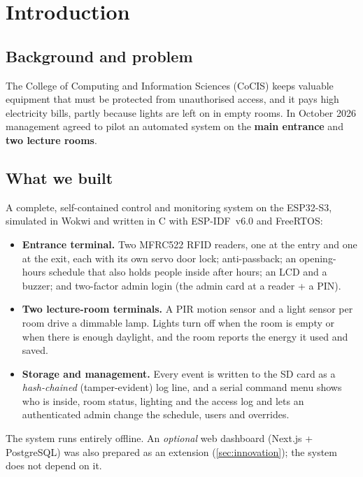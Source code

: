 \section{Introduction}
\label{sec:intro}

\subsection{Background and problem}
The College of Computing and Information Sciences (CoCIS) keeps valuable equipment that must be
protected from unauthorised access, and it pays high electricity bills, partly because lights are
left on in empty rooms. In October 2026 management agreed to pilot an automated system on the
\textbf{main entrance} and \textbf{two lecture rooms}.

\subsection{What we built}
A complete, self-contained control and monitoring system on the ESP32-S3, simulated in Wokwi and
written in C with ESP-IDF~v6.0 and FreeRTOS:
\begin{itemize}
  \item \textbf{Entrance terminal.} Two MFRC522 RFID readers, one at the entry and one at the
        exit, each with its own servo door lock; anti-passback; an opening-hours schedule that also
        holds people inside after hours; an LCD and a buzzer; and two-factor admin login (the admin
        card at a reader + a PIN).
  \item \textbf{Two lecture-room terminals.} A PIR motion sensor and a light sensor per room drive a
        dimmable lamp. Lights turn off when the room is empty or when there is enough daylight, and
        the room reports the energy it used and saved.
  \item \textbf{Storage and management.} Every event is written to the SD card as a
        \emph{hash-chained} (tamper-evident) log line, and a serial command menu shows who is
        inside, room status, lighting and the access log and lets an authenticated admin change
        the schedule, users and overrides.
\end{itemize}
The system runs entirely offline. An \emph{optional} web dashboard (Next.js + PostgreSQL) was also
prepared as an extension (\cref{sec:innovation}); the system does not depend on it.


